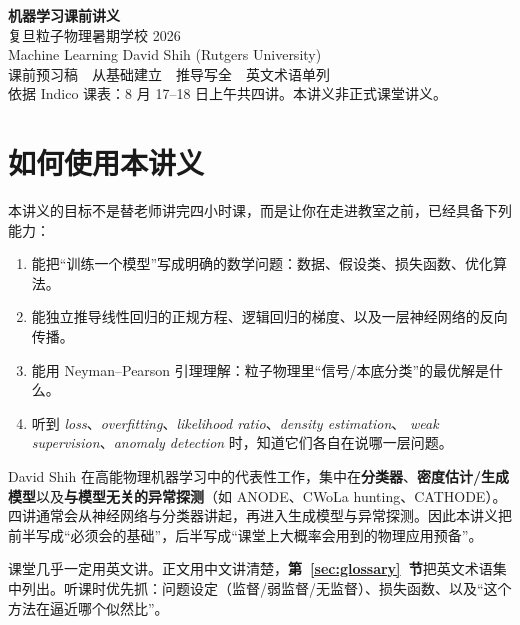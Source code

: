 \documentclass[11pt,a4paper]{article}
\theoremstyle{definition}
\theoremstyle{plain}
\theoremstyle{remark}
\begin{document}
\begin{center}
{\LARGE\bfseries 机器学习课前讲义}\\[0.45em]
{\large 复旦粒子物理暑期学校 2026}\\[0.25em]
{\large Machine Learning \quad David Shih (Rutgers University)}\\[0.8em]
{\normalsize 课前预习稿　从基础建立　推导写全　英文术语单列}\\[0.35em]
{\small 依据 Indico 课表：8 月 17--18 日上午共四讲。本讲义非正式课堂讲义。}
\end{center}

\tableofcontents
\newpage

\section{如何使用本讲义}

本讲义的目标不是替老师讲完四小时课，而是让你在走进教室之前，已经具备下列能力：

\begin{enumerate}[leftmargin=1.6em]
  \item 能把``训练一个模型''写成明确的数学问题：数据、假设类、损失函数、优化算法。
  \item 能独立推导线性回归的正规方程、逻辑回归的梯度、以及一层神经网络的反向传播。
  \item 能用 Neyman--Pearson 引理理解：粒子物理里``信号/本底分类''的最优解是什么。
  \item 听到 \emph{loss}、\emph{overfitting}、\emph{likelihood ratio}、\emph{density estimation}、
        \emph{weak supervision}、\emph{anomaly detection} 时，知道它们各自在说哪一层问题。
\end{enumerate}

David Shih 在高能物理机器学习中的代表性工作，集中在\textbf{分类器}、\textbf{密度估计/生成模型}以及\textbf{与模型无关的异常探测}（如 ANODE、CWoLa hunting、CATHODE）。四讲通常会从神经网络与分类器讲起，再进入生成模型与异常探测。因此本讲义把前半写成``必须会的基础''，后半写成``课堂上大概率会用到的物理应用预备''。

\begin{hearbox}
课堂几乎一定用英文讲。正文用中文讲清楚，\textbf{第~\ref{sec:glossary}~节}把英文术语集中列出。听课时优先抓：问题设定（监督/弱监督/无监督）、损失函数、以及``这个方法在逼近哪个似然比''。
\end{hearbox}
\end{document}
